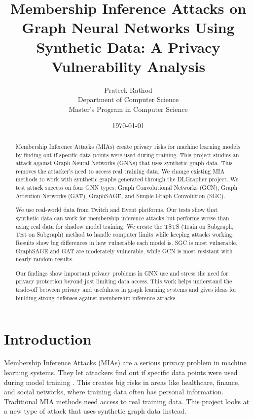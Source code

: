 \documentclass{article}
\title{Membership Inference Attacks on Graph Neural Networks Using Synthetic Data: A Privacy Vulnerability Analysis}
\author{Prateek Rathod\\
Department of Computer Science\\
Master's Program in Computer Science}
\date{\today}
\begin{document}
\maketitle

\begin{abstract}
Membership Inference Attacks (MIAs) create privacy risks for machine learning models by finding out if specific data points were used during training. This project studies an attack against Graph Neural Networks (GNNs) that uses synthetic graph data. This removes the attacker's need to access real training data. We change existing MIA methods to work with synthetic graphs generated through the DLGrapher project\cite{dlgrapher2022}. We test attack success on four GNN types: Graph Convolutional Networks (GCN), Graph Attention Networks (GAT), GraphSAGE, and Simple Graph Convolution (SGC). 

We use real-world data from Twitch and Event platforms. Our tests show that synthetic data can work for membership inference attacks but performs worse than using real data for shadow model training. We create the TSTS (Train on Subgraph, Test on Subgraph) method to handle computer limits while keeping attacks working. Results show big differences in how vulnerable each model is. SGC is most vulnerable, GraphSAGE and GAT are moderately vulnerable, while GCN is most resistant with nearly random results. 

Our findings show important privacy problems in GNN use and stress the need for privacy protection beyond just limiting data access. This work helps understand the trade-off between privacy and usefulness in graph learning systems and gives ideas for building strong defenses against membership inference attacks.
\end{abstract}

\tableofcontents
\newpage

\section{Introduction}
Membership Inference Attacks (MIAs) are a serious privacy problem in machine learning systems. They let attackers find out if specific data points were used during model training \cite{shokri2017membership}. This creates big risks in areas like healthcare, finance, and social networks, where training data often has personal information. Traditional MIA methods need access to real training data. This project looks at a new type of attack that uses synthetic graph data instead.
\end{document}
